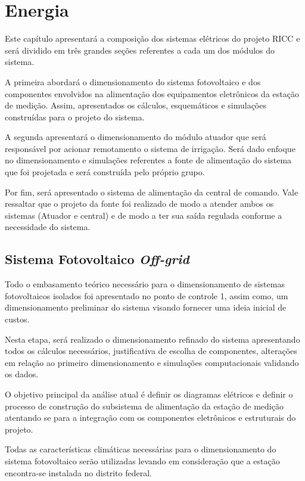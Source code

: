\chapter[Energia]{Energia}

Este capítulo apresentará a composição dos sistemas elétricos do projeto RICC e será dividido em três grandes seções referentes a cada um dos módulos do sistema.

A primeira abordará o dimensionamento do sistema fotovoltaico e dos componentes envolvidos na alimentação dos equipamentos eletrônicos da estação de medição. Assim, apresentados os cálculos, esquemáticos e simulações construídas para o projeto do sistema.

A segunda apresentará o dimensionamento do módulo atuador que será responsável por acionar remotamento o sistema de irrigação. Será dado enfoque no dimensionamento e simulações referentes a fonte de alimentação do sistema que foi projetada e será construída pelo próprio grupo.

Por fim, será apresentado o sistema de alimentação da central de comando. Vale ressaltar que o projeto da fonte foi realizado de modo a atender ambos os sistemas (Atuador e central) e de modo a ter sua saída regulada conforme a necessidade do sistema.

\section{Sistema Fotovoltaico \textit{Off-grid}}

Todo o embasamento teórico necessário para o dimensionamento de sistemas fotovoltaicos isolados foi apresentado no ponto de controle 1, assim como, um dimensionamento preliminar do sistema visando fornecer uma ideia inicial de custos.

Nesta etapa, será realizado o dimensionamento refinado do sistema apresentando todos os cálculos necessários, justificativa de escolha de componentes, alterações em relação ao primeiro dimensionamento e simulações computacionais validando os dados. 

O objetivo principal da análise atual é definir os diagramas elétricos e definir o processo de construção do subsistema de alimentação da estação de medição atentando se para a integração com os componentes eletrônicos e estruturais do projeto.

Todas as características climáticas necessárias para o dimensionamento do sistema fotovoltaico serão utilizadas levando em consideração que a estação encontra-se instalada no distrito federal. 

